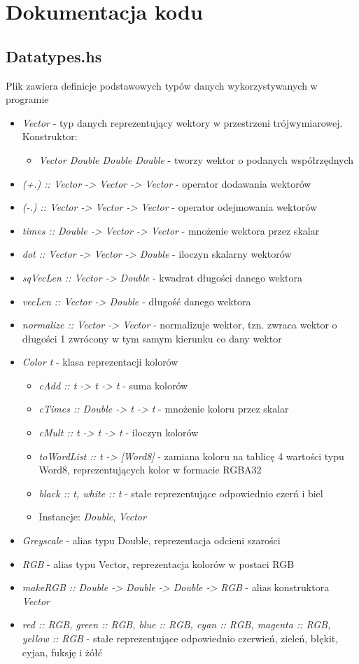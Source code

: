 \documentclass[11pt,a4paper]{article}
\begin{document}
\section{Dokumentacja kodu}
\subsection{Datatypes.hs}
Plik zawiera definicje podstawowych typów danych wykorzystywanych w programie
\begin{itemize}
\item\textit{Vector} - typ danych reprezentujący wektory w przestrzeni trójwymiarowej.\\Konstruktor:
\begin{itemize}
\item\textit{Vector Double Double Double} - tworzy wektor o podanych współrzędnych
\end{itemize}
\item\textit{(+.) :: Vector -> Vector -> Vector} - operator dodawania wektorów
\item\textit{(-.) :: Vector -> Vector -> Vector} - operator odejmowania wektorów
\item\textit{times :: Double -> Vector -> Vector} - mnożenie wektora przez skalar
\item\textit{dot :: Vector -> Vector -> Double} - iloczyn skalarny wektorów
\item\textit{sqVecLen :: Vector -> Double} - kwadrat długości danego wektora
\item\textit{vecLen :: Vector -> Double} - długość danego wektora
\item\textit{normalize :: Vector -> Vector} - normalizuje wektor, tzn. zwraca wektor o długości 1 zwrócony w tym samym kierunku co dany wektor
\item\textit{Color t} - klasa reprezentacji kolorów
\begin{itemize}
\item\textit{cAdd :: t -> t -> t} - suma kolorów
\item\textit{cTimes :: Double -> t -> t} - mnożenie koloru przez skalar
\item\textit{cMult :: t -> t -> t} - iloczyn kolorów
\item\textit{toWordList :: t -> [Word8]} - zamiana koloru na tablicę 4 wartości typu Word8, reprezentujących kolor w formacie RGBA32
\item\textit{black :: t, white :: t} - stałe reprezentujące odpowiednio czerń i biel
\item Instancje: \textit{Double}, \textit{Vector}
\end{itemize}
\item\textit{Greyscale} - alias typu Double, reprezentacja odcieni szarości
\item\textit{RGB} - alias typu Vector, reprezentacja kolorów w postaci RGB
\item\textit{makeRGB :: Double -> Double -> Double -> RGB} - alias konstruktora \textit{Vector}
\item\textit{red :: RGB, green :: RGB, blue :: RGB, cyan :: RGB, magenta :: RGB, yellow :: RGB} - stałe reprezentujące odpowiednio czerwień, zieleń,  błękit, cyjan, fuksję i żółć
\end{itemize}
\end{document}
